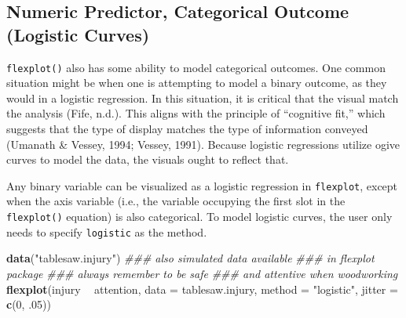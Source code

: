 \documentclass[
  doc]{apa6}
\newenvironment{Shaded}{\begin{snugshade}}{\end{snugshade}}
\newcommand{\CommentTok}[1]{\textcolor[rgb]{0.56,0.35,0.01}{\textit{#1}}}
\newcommand{\DataTypeTok}[1]{\textcolor[rgb]{0.13,0.29,0.53}{#1}}
\newcommand{\DecValTok}[1]{\textcolor[rgb]{0.00,0.00,0.81}{#1}}
\newcommand{\FloatTok}[1]{\textcolor[rgb]{0.00,0.00,0.81}{#1}}
\newcommand{\KeywordTok}[1]{\textcolor[rgb]{0.13,0.29,0.53}{\textbf{#1}}}
\newcommand{\NormalTok}[1]{#1}
\newcommand{\OperatorTok}[1]{\textcolor[rgb]{0.81,0.36,0.00}{\textbf{#1}}}
\newcommand{\StringTok}[1]{\textcolor[rgb]{0.31,0.60,0.02}{#1}}
\begin{document}
\hypertarget{numeric-predictor-categorical-outcome-logistic-curves}{%
\subsection{Numeric Predictor, Categorical Outcome (Logistic Curves)}\label{numeric-predictor-categorical-outcome-logistic-curves}}

\texttt{flexplot()} also has some ability to model categorical outcomes. One common situation might be when one is attempting to model a binary outcome, as they would in a logistic regression. In this situation, it is critical that the visual match the analysis (Fife, n.d.). This aligns with the principle of \enquote{cognitive fit,} which suggests that the type of display matches the type of information conveyed (Umanath \& Vessey, 1994; Vessey, 1991). Because logistic regressions utilize ogive curves to model the data, the visuals ought to reflect that.

Any binary variable can be visualized as a logistic regression in \texttt{flexplot}, except when the axis variable (i.e., the variable occupying the first slot in the \texttt{flexplot()} equation) is also categorical. To model logistic curves, the user only needs to specify \texttt{logistic} as the method.

\begin{Shaded}
\begin{Highlighting}[]
\KeywordTok{data}\NormalTok{(}\StringTok{"tablesaw.injury"}\NormalTok{) }\CommentTok{### also simulated data available }
                        \CommentTok{### in flexplot package}
                        \CommentTok{### always remember to be safe }
                        \CommentTok{### and attentive when woodworking}
\KeywordTok{flexplot}\NormalTok{(injury }\OperatorTok{~}\StringTok{ }\NormalTok{attention, }\DataTypeTok{data =}\NormalTok{ tablesaw.injury, }
             \DataTypeTok{method =} \StringTok{"logistic"}\NormalTok{, }\DataTypeTok{jitter =} \KeywordTok{c}\NormalTok{(}\DecValTok{0}\NormalTok{, }\FloatTok{.05}\NormalTok{))}
\end{Highlighting}
\end{Shaded}
\end{document}
